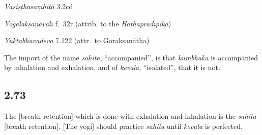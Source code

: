 \begin{ekdosis}
\begin{sources}[hp02_072]
\begin{versinnote}
\end{versinnote}

\emph{Vasiṣṭhasaṃhitā} 3.2cd

\begin{versinnote}
\end{versinnote}
\end{sources}

\begin{testimonia}[hp02_072]
\emph{Yogalakṣaṇāvalī} f.~32r (attrib. to the \emph{Haṭhapradīpikā})
\begin{versinnote}
\end{versinnote}

\emph{Yuktabhavadeva} 7.122 (attr.~to Gorakṣanātha)

\begin{versinnote}
\end{versinnote}
\end{testimonia}

\begin{philcomm}[hp02_072]
The import of the name \emph{sahita}, “accompanied”, is that \emph{kumbhaka} is accompanied by inhalation and exhalation, and of \emph{kevala}, “isolated”, that it is not.
\end{philcomm}

\subsection*{2.73}
\begin{translation}[hp02_073]
The [breath retention] which is done with exhalation and inhalation is the \emph{sahita} [breath retention]. [The yogi] should practice \emph{sahita} until \emph{kevala} is perfected.
\end{translation}



\end{ekdosis}
